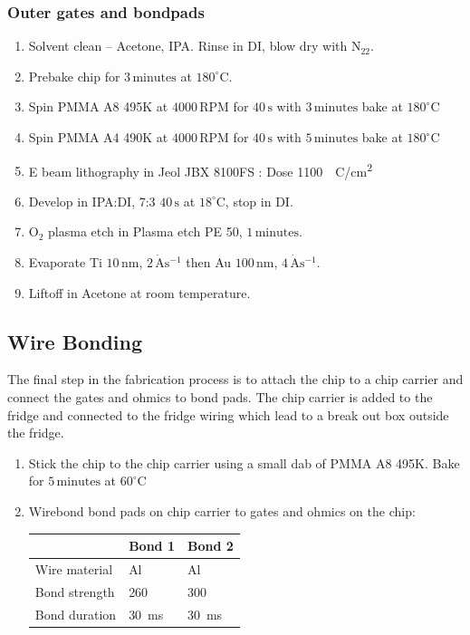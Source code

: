 \subsubsection{Outer gates and bondpads }

\begin{enumerate}
\item Solvent clean – Acetone, IPA. Rinse in DI, blow dry with $\mathrm{N_22}$.
\item Prebake chip for $3\,\mathrm{minutes}$ at $180^\circ$C.
\item Spin PMMA A8 495K at $4000\,\mathrm{RPM}$ for $40\,\mathrm{s}$  with $3\,\mathrm{minutes}$ bake at $180^\circ$C
\item Spin PMMA A4 490K at $4000\,\mathrm{RPM}$ for $40\,\mathrm{s}$  with $5\,\mathrm{minutes}$ bake at $180^\circ$C
\item E beam lithography in Jeol JBX 8100FS : Dose \qty{1100}{\mu C/cm^2}
\item Develop in IPA:DI, 7:3 $40\,\mathrm{s}$ at $18^\circ$C, stop in DI.
\item $\mathrm{O_2}$ plasma etch in Plasma etch PE 50, $1\,\mathrm{minutes}$.
\item Evaporate Ti $10\,\mathrm{nm}$, $2\,\mathrm{\dot{A}s^{-1}}$ then Au $100\,\mathrm{nm}$, $4\,\mathrm{\dot{A}s^{-1}}$.
\item Liftoff in Acetone at room temperature.
\end{enumerate}




\subsection{Wire Bonding}

The final step in the fabrication process is to attach the chip to a chip carrier and connect the gates and ohmics to bond pads. The chip carrier is added to the fridge and connected to the fridge wiring which lead to a break out box outside the fridge. 


\begin{enumerate}
\item Stick the chip to the chip carrier using a small dab of PMMA A8 495K. Bake for $5\,\mathrm{minutes}$ at $60^\circ$C
\item Wirebond bond pads on chip carrier to gates and ohmics on the chip:
\begin{table}[H]     
\centering
  \begin{tabular}{|p{3.0cm}|p{2.0cm}|p{2.0cm}|}
    \hline
     & Bond 1 & Bond 2\\
    \hline
    Wire material & Al & Al\\
    Bond strength & 260 & 300\\
    Bond duration & \qty{30}{ms} & \qty{30}{ms} \\
    \hline
  \end{tabular}
\label{tab:wire_bonding}
\end{table}
\end{enumerate}
